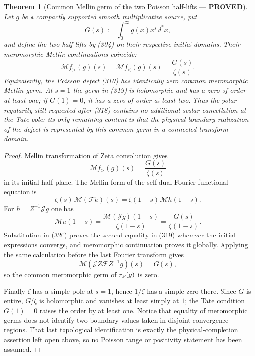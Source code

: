 \documentclass[11pt]{article}
\newtheorem{theorem}{Theorem}
\newcommand{\PROVED}{\textcolor{green!45!black}{\textbf{PROVED}}}
\begin{document}
\begin{theorem}[Common Mellin germ of the two Poisson half-lifts --- \PROVED]
Let $g$ be a compactly supported smooth multiplicative source, put
\[
 G(s):=\int_0^\infty g(x)x^s\,d^*x,
\]
and define the two half-lifts by (304) on their respective initial domains.
Their meromorphic Mellin continuations coincide:
\begin{equation}
 \boxed{
  \mathcal M f_>(g)(s)=\mathcal M f_<(g)(s)
       =\frac{G(s)}{\zeta(s)}.}                       \tag{319}
\end{equation}
Equivalently, the Poisson defect (310) has identically zero common
meromorphic Mellin germ.  At $s=1$ the germ in (319) is holomorphic and has
a zero of order at least one; if $G(1)=0$, it has a zero of order at least
two.  Thus the polar regularity still requested after (318) contains no
additional scalar cancellation at the Tate pole: its only remaining content
is that the physical boundary realization of the defect is represented by
this common germ in a connected transform domain.
\end{theorem}

\begin{proof}
Mellin transformation of Zeta convolution gives
\[
 \mathcal M f_>(g)(s)=\frac{G(s)}{\zeta(s)}
\]
in its initial half-plane.  The Mellin form of the self-dual Fourier
functional equation is
\begin{equation}
 \zeta(s)\,\mathcal M(\mathcal Fh)(s)
 =\zeta(1-s)\,\mathcal Mh(1-s).                       \tag{320}
\end{equation}
For $h=Z^{-1}\mathscr Jg$ one has
\[
 \mathcal Mh(1-s)
 =\frac{\mathcal M(\mathscr Jg)(1-s)}{\zeta(1-s)}
 =\frac{G(s)}{\zeta(1-s)}.
\]
Substitution in (320) proves the second equality in (319) wherever the
initial expressions converge, and meromorphic continuation proves it
globally.  Applying the same calculation before the last Fourier transform
gives
\[
 \mathcal M(\mathscr JZ\mathcal FZ^{-1}g)(s)=G(s),
\]
so the common meromorphic germ of $r_{\rm P}(g)$ is zero.

Finally $\zeta$ has a simple pole at $s=1$, hence $1/\zeta$ has a simple
zero there.  Since $G$ is entire, $G/\zeta$ is holomorphic and vanishes at
least simply at $1$; the Tate condition $G(1)=0$ raises the order by at
least one.  Notice that equality of meromorphic germs does not identify two
boundary values taken in disjoint convergence regions.  That last
topological identification is exactly the physical-completion assertion
left open above, so no Poisson range or positivity statement has been
assumed.
\end{proof}
\end{document}
